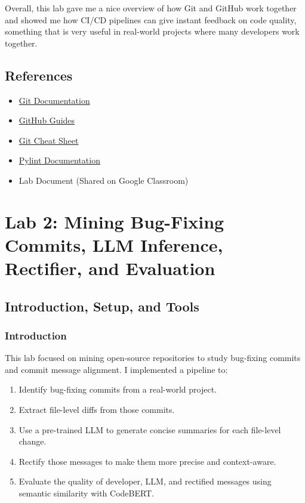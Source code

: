 \documentclass[10pt,a4paper]{report}
\begin{document}
Overall, this lab gave me a nice overview of how Git and GitHub work together and showed me how CI/CD pipelines can give instant feedback on code quality, something that is very useful in real-world projects where many developers work together.




\section{References}
\begin{itemize}[itemsep=0.01em, topsep=0pt]
    \item \href{https://git-scm.com/doc}{Git Documentation}
    \item \href{https://docs.github.com/en}{GitHub Guides}
    \item \href{https://education.github.com/git-cheat-sheet-education.pdf}{Git Cheat Sheet}
    \item \href{https://docs.pylint.org/}{Pylint Documentation}
    \item Lab Document (Shared on Google Classroom)
\end{itemize}





\chapter{Lab 2: Mining Bug-Fixing Commits, LLM Inference, Rectifier, and Evaluation}

\section{Introduction, Setup, and Tools}

\subsection{Introduction}
This lab focused on mining open-source repositories to study bug-fixing commits and commit message alignment. I implemented a pipeline to:
\begin{enumerate}[itemsep=0.05em, topsep=0pt]
    \item Identify bug-fixing commits from a real-world project.
    \item Extract file-level diffs from those commits.
    \item Use a pre-trained LLM to generate concise summaries for each file-level change.
    \item Rectify those messages to make them more precise and context-aware.
    \item Evaluate the quality of developer, LLM, and rectified messages using semantic similarity with CodeBERT.
\end{enumerate}
\end{document}

